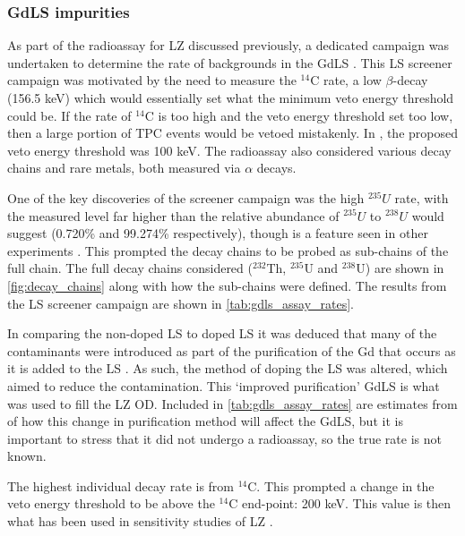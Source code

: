 \subsubsection{GdLS impurities}
\par
As part of the radioassay for LZ discussed previously, a dedicated campaign was undertaken to determine the rate of backgrounds in the GdLS \cite{scotthaselschwardt_thesis_ref}.
This LS screener campaign was motivated by the need to measure the $^{14}$C rate, a low $\beta$-decay (156.5 keV) which would essentially set what the minimum veto energy threshold could be.
If the rate of $^{14}$C is too high and the veto energy threshold set too low, then a large portion of TPC events would be vetoed mistakenly.
In \cite{LZ_TechnicalDesignReview_ref}, the proposed veto energy threshold was 100 keV.
The radioassay also considered various decay chains and rare metals, both measured via $\alpha$ decays.
\par
One of the key discoveries of the screener campaign was the high ${}^{235}U$ rate, with the measured level far higher than the relative abundance of ${}^{235}U$ to ${}^{238}U$ would suggest (0.720\% and 99.274\% respectively), though is a feature seen in other experiments \cite{javierperez_thesis_ref,superkamiokande_neutron_tagging_ref}.
This prompted the decay chains to be probed as sub-chains of the full chain.
The full decay chains considered ($^{232}$Th, $^{235}$U and $^{238}$U) are shown in \autoref{fig:decay_chains} along with how the sub-chains were defined.
The results from the LS screener campaign are shown in \autoref{tab:gdls_assay_rates}.
\par
In comparing the non-doped LS to doped LS it was deduced that many of the contaminants were introduced as part of the purification of the Gd that occurs as it is added to the LS \cite{scotthaselschwardt_thesis_ref}.
As such, the method of doping the LS was altered, which aimed to reduce the contamination.
This `improved purification' GdLS is what was used to fill the LZ OD.
Included in \autoref{tab:gdls_assay_rates} are estimates from \cite{scotthaselschwardt_thesis_ref} of how this change in purification method will affect the GdLS, but it is important to stress that it did not undergo a radioassay, so the true rate is not known.
\par
The highest individual decay rate is from ${}^{14}$C.
This prompted a change in the veto energy threshold to be above the ${}^{14}$C end-point: 200 keV.
This value is then what has been used in sensitivity studies of LZ \cite{LZ_projected_sensitivity_paper_ref}.

